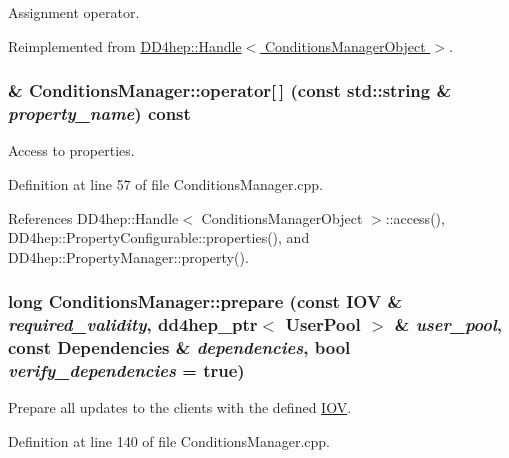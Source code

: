 Assignment operator. 

Reimplemented from \hyperlink{class_d_d4hep_1_1_handle_a9bbf8f498df42e81ad26fb00233505a6}{DD4hep::Handle$<$ ConditionsManagerObject $>$}.\hypertarget{class_d_d4hep_1_1_conditions_1_1_conditions_manager_a32b209109e8a5c26ac1b6d8ca688c9dc}{
\subsubsection[{operator[]}]{ \& ConditionsManager::operator\mbox{[}$\,$\mbox{]} (const std::string \& {\em property\_\-name}) const}}
\label{class_d_d4hep_1_1_conditions_1_1_conditions_manager_a32b209109e8a5c26ac1b6d8ca688c9dc}


Access to properties. 

Definition at line 57 of file ConditionsManager.cpp.

References DD4hep::Handle$<$ ConditionsManagerObject $>$::access(), DD4hep::PropertyConfigurable::properties(), and DD4hep::PropertyManager::property().\hypertarget{class_d_d4hep_1_1_conditions_1_1_conditions_manager_afb09828cf1420ca6a9abb815ccf7d06c}{
\subsubsection[{prepare}]{\setlength{\rightskip}{0pt plus 5cm}long ConditionsManager::prepare (const {\bf IOV} \& {\em required\_\-validity}, \/  {\bf dd4hep\_\-ptr}$<$ {\bf UserPool} $>$ \& {\em user\_\-pool}, \/  const {\bf Dependencies} \& {\em dependencies}, \/  bool {\em verify\_\-dependencies} = {\ttfamily true})}}
\label{class_d_d4hep_1_1_conditions_1_1_conditions_manager_afb09828cf1420ca6a9abb815ccf7d06c}


Prepare all updates to the clients with the defined \hyperlink{class_d_d4hep_1_1_i_o_v}{IOV}. 

Definition at line 140 of file ConditionsManager.cpp.

